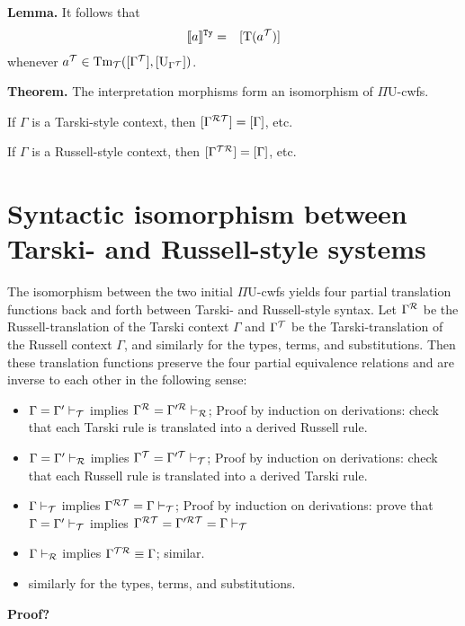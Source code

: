 \documentclass{lmcs}
\def\UU{\mathrm{U}}
\def\Ta{\mathrm{T}}
\newcommand{\intTyU}[1]{\llbracket #1 \rrbracket^\RawTy}
\begin{document}
{\bf Lemma.}
It follows that
\begin{eqnarray*}
\intTyU{a} &=& [ \Ta(a^\T) ]
\end{eqnarray*}
whenever $a^\T \in  \Tm_\T([\Gamma^\T],[\UU_{\Gamma^\T}])$. 

{\bf Theorem.} The interpretation morphisms form an isomorphism of $\Pi\UU$-cwfs. 

If $\Gamma$ is a Tarski-style context, then $[ \Gamma^{\mathcal{R}{\mathcal T}} ] = [ \Gamma ]$, etc. 

If $\Gamma$ is a Russell-style context, then $[ \Gamma^{{\mathcal T}\mathcal{R}} ] = [ \Gamma ]$, etc.

\section{Syntactic isomorphism between Tarski- and Russell-style systems}

The isomorphism between the two initial $\Pi\UU$-cwfs yields four partial translation functions back and forth between Tarski- and Russell-style syntax. Let $\Gamma^{\mathcal{R}}$ be the Russell-translation of the Tarski context $\Gamma$ and $\Gamma^{\mathcal T}$ be the Tarski-translation of the Russell context $\Gamma$, and similarly for the types, terms, and substitutions. Then these translation functions preserve the four partial equivalence relations and are inverse to each other in the following sense:
 \begin{itemize}
\item $\Gamma = \Gamma' \vdash_{\mathcal T}$ implies $\Gamma^{\mathcal{R}} = \Gamma'^{\mathcal{R}}\vdash_{\mathcal{R}}$;
Proof by induction on derivations: check that each Tarski rule is translated into a derived Russell rule.
\item $\Gamma = \Gamma' \vdash_{\mathcal{R}}$ implies $\Gamma^{\mathcal T} = \Gamma'^{\mathcal T} \vdash_{\mathcal T}$;
Proof by induction on derivations: check that each Russell rule is translated into a derived Tarski rule.
\item $\Gamma \vdash_{\mathcal T}$ implies $\Gamma^{\mathcal{R}{\mathcal T}} = \Gamma \vdash_{\mathcal T}$;
Proof by induction on derivations: prove that $\Gamma = \Gamma' \vdash_{\mathcal T}$ implies $\Gamma^{\mathcal{R}{\mathcal T}} = \Gamma'^{\mathcal{R}{\mathcal T}} = \Gamma \vdash_{\mathcal T}$
\item $\Gamma \vdash_{\mathcal{R}}$ implies $\Gamma^{{\mathcal T}\mathcal{R}} \equiv \Gamma$; similar.
\item similarly for the types, terms, and substitutions.
\end{itemize}
{\bf Proof?}
\end{document}
